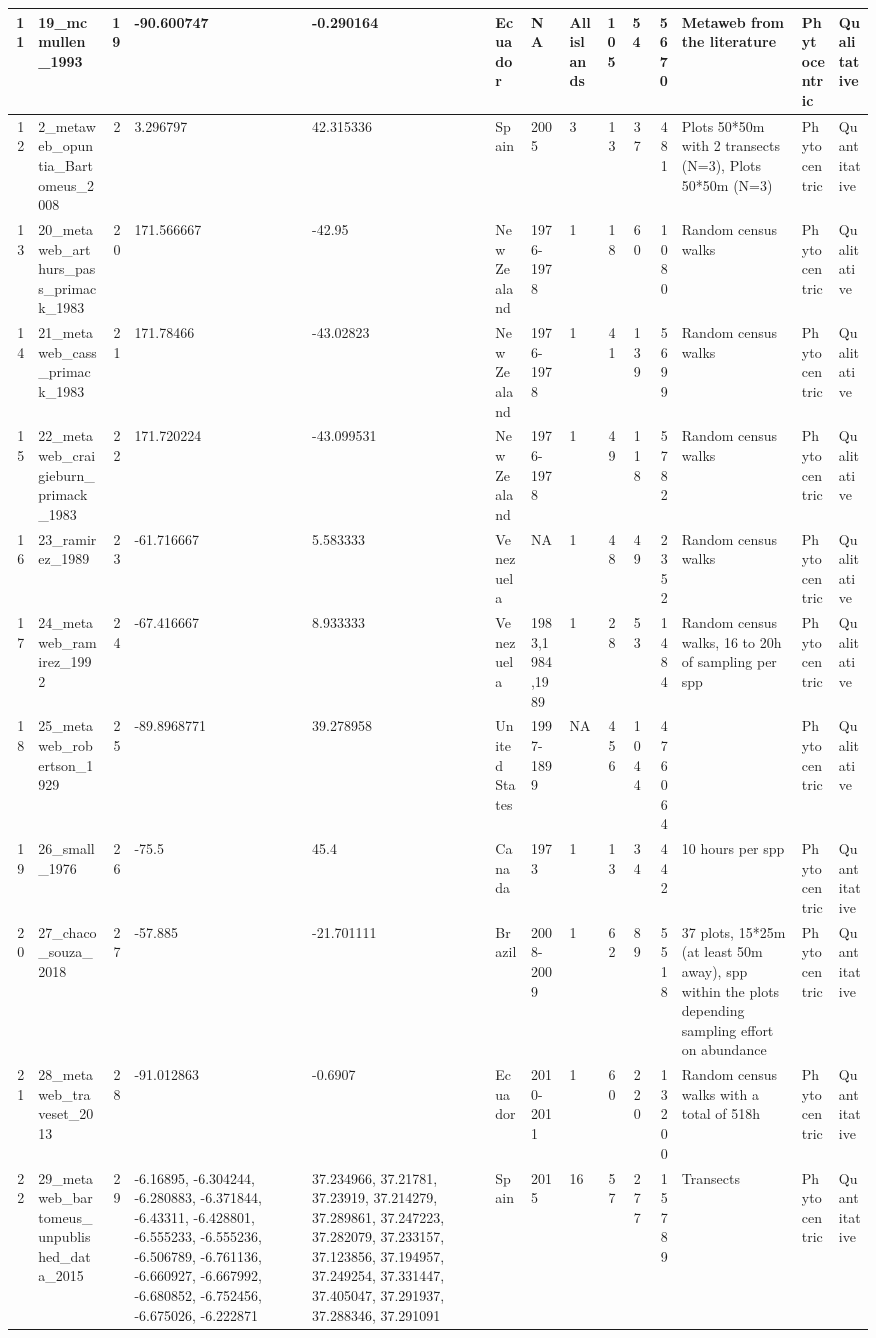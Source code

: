 \documentclass[12pt,]{article}
\begin{document}
\begin{tabular}{r|l|r|l|l|l|l|l|r|r|r|l|l|l}
\hline
11 & 19\_mcmullen\_1993 & 19 & -90.600747 & -0.290164 & Ecuador & NA & All islands & 105 & 54 & 5670 & Metaweb from the literature & Phytocentric & Qualitative\\
\hline
12 & 2\_metaweb\_opuntia\_Bartomeus\_2008 & 2 & 3.296797 & 42.315336 & Spain & 2005 & 3 & 13 & 37 & 481 & Plots 50*50m with 2 transects (N=3), Plots 50*50m (N=3) & Phytocentric & Quantitative\\
\hline
13 & 20\_metaweb\_arthurs\_pass\_primack\_1983 & 20 & 171.566667 & -42.95 & New Zealand & 1976-1978 & 1 & 18 & 60 & 1080 & Random census walks & Phytocentric & Qualitative\\
\hline
14 & 21\_metaweb\_cass\_primack\_1983 & 21 & 171.78466 & -43.02823 & New Zealand & 1976-1978 & 1 & 41 & 139 & 5699 & Random census walks & Phytocentric & Qualitative\\
\hline
15 & 22\_metaweb\_craigieburn\_primack\_1983 & 22 & 171.720224 & -43.099531 & New Zealand & 1976-1978 & 1 & 49 & 118 & 5782 & Random census walks & Phytocentric & Qualitative\\
\hline
16 & 23\_ramirez\_1989 & 23 & -61.716667 & 5.583333 & Venezuela & NA & 1 & 48 & 49 & 2352 & Random census walks & Phytocentric & Qualitative\\
\hline
17 & 24\_metaweb\_ramirez\_1992 & 24 & -67.416667 & 8.933333 & Venezuela & 1983,1984,1989 & 1 & 28 & 53 & 1484 & Random census walks, 16 to 20h of sampling per spp & Phytocentric & Qualitative\\
\hline
18 & 25\_metaweb\_robertson\_1929 & 25 & -89.8968771 & 39.278958 & United States & 1997-1899 & NA & 456 & 1044 & 476064 &  & Phytocentric & Qualitative\\
\hline
19 & 26\_small\_1976 & 26 & -75.5 & 45.4 & Canada & 1973 & 1 & 13 & 34 & 442 & 10 hours per spp & Phytocentric & Quantitative\\
\hline
20 & 27\_chaco\_souza\_2018 & 27 & -57.885 & -21.701111 & Brazil & 2008-2009 & 1 & 62 & 89 & 5518 & 37 plots, 15*25m (at least 50m away), spp within the plots depending sampling effort on abundance & Phytocentric & Quantitative\\
\hline
21 & 28\_metaweb\_traveset\_2013 & 28 & -91.012863 & -0.6907 & Ecuador & 2010-2011 & 1 & 60 & 220 & 13200 & Random census walks with a total of 518h & Phytocentric & Quantitative\\
\hline
22 & 29\_metaweb\_bartomeus\_unpublished\_data\_2015 & 29 & -6.16895, -6.304244, -6.280883, -6.371844, -6.43311, -6.428801, -6.555233, -6.555236, -6.506789, -6.761136, -6.660927, -6.667992, -6.680852, -6.752456, -6.675026, -6.222871 & 37.234966, 37.21781, 37.23919, 37.214279, 37.289861, 37.247223, 37.282079, 37.233157, 37.123856, 37.194957, 37.249254, 37.331447, 37.405047, 37.291937, 37.288346, 37.291091 & Spain & 2015 & 16 & 57 & 277 & 15789 & Transects & Phytocentric & Quantitative\\

\end{tabular}
\end{document}
